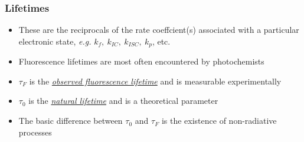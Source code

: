 \documentclass[ignorenonframetext]{beamer}
\begin{document}
\begin{frame}[<+->][label=fluorescencelifetimes]
\frametitle{Lifetimes}
\begin{itemize}
\item These are the reciprocals of the rate coeffcient(s) associated with a particular electronic state, \textit{e.g.} \(k_f, \ k_{IC}, \ k_{ISC}, \ k_p\), etc.
\item Fluorescence lifetimes are most often encountered by photochemists
\item \(\tau_F\) is the \emph{\underline{observed fluorescence lifetime}} and is measurable experimentally
\item \(\tau_0\) is the \emph{\underline{natural lifetime}} and is a theoretical parameter
\item The basic difference between \(\tau_0\) and \(\tau_F\) is the existence of non-radiative processes \hyperlink{experimentallifetimes<3>}{}
\end{itemize}
\begin{columns}[t,onlytextwidth]
\begin{column}{.45\textwidth}
\end{column}
\begin{column}{.5\textwidth}
\end{column}
\end{columns}
\end{frame}

\end{document}
